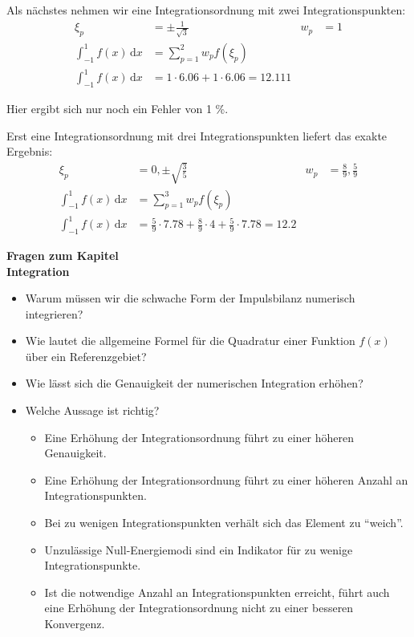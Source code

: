 Als nächstes nehmen wir eine Integrationsordnung mit zwei Integrationspunkten:
\begin{align*}
\xi_p &= \pm \frac{1}{\sqrt{3}} & w_p &= 1 \\
\int_{-1}^{1} f(x) \, \mathrm{d}x &= \sum_{p=1}^{2} w_p f(\xi_p)  \\
\int_{-1}^{1} f(x) \, \mathrm{d}x &= 1 \cdot 6.06  + 1 \cdot 6.06 = 12.111
\end{align*}

Hier ergibt sich nur noch ein Fehler von 1 \%.

Erst eine Integrationsordnung mit drei Integrationspunkten liefert das exakte Ergebnis:
\begin{align*}
\xi_p &= 0, \pm \sqrt{\frac{3}{5}} & w_p &= \frac{8}{9}, \frac{5}{9} \\
\int_{-1}^{1} f(x) \, \mathrm{d}x &= \sum_{p=1}^{3} w_p f(\xi_p) \\
\int_{-1}^{1} f(x) \, \mathrm{d}x &= \frac{5}{9} \cdot 7.78  + \frac{8}{9} \cdot 4 + \frac{5}{9} \cdot 7.78  = 12.2
\end{align*}

\begin{framed}
\textbf{Fragen zum Kapitel}\\
\textbf{Integration}

\begin{itemize}
\item Warum müssen wir die schwache Form der Impulsbilanz numerisch integrieren?
\item Wie lautet die allgemeine Formel für die Quadratur einer Funktion $f(x)$ über ein Referenzgebiet?
\item Wie lässt sich die Genauigkeit der numerischen Integration erhöhen?
\item Welche Aussage ist richtig?\begin{itemize}
\item Eine Erhöhung der Integrationsordnung führt zu einer höheren Genauigkeit.
\item Eine Erhöhung der Integrationsordnung führt zu einer höheren Anzahl an Integrationspunkten.
\item Bei zu wenigen Integrationspunkten verhält sich das Element zu ``weich''.
\item Unzulässige Null-Energiemodi sind ein Indikator für zu wenige Integrationspunkte.
\item Ist die notwendige Anzahl an Integrationspunkten erreicht, führt auch eine Erhöhung der Integrationsordnung nicht zu einer besseren Konvergenz.
\end{itemize}
\end{itemize}
\end{framed}